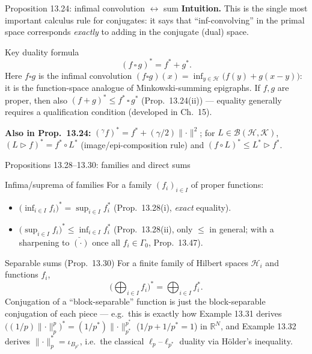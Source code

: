 \documentclass[aspectratio=169,10pt]{beamer}
\newcommand{\R}{\mathbb{R}}
\newcommand{\Hil}{\mathcal{H}}
\newcommand{\Kil}{\mathcal{K}}
\newcommand{\norm}[1]{\lVert #1 \rVert}
\newcommand{\conj}[1]{#1^{*}}
\begin{document}
\begin{frame}{Proposition 13.24: infimal convolution $\leftrightarrow$ sum}
  \textbf{Intuition.} This is the single most important calculus rule for
  conjugates: it says that ``inf-convolving'' in the primal space
  corresponds \emph{exactly} to adding in the conjugate (dual) space.
  \begin{block}{Key duality formula}
    \[
      (f\,\square\,g)^{*} = \conj f + \conj g.
      \tag{13.17}
    \]
    Here $f\square g$ is the infimal convolution
    $(f\square g)(x)=\inf_{y\in\Hil}\big(f(y)+g(x-y)\big)$: it is the
    function-space analogue of Minkowski-summing epigraphs. If $f,g$ are
    proper, then also $(f+g)^{*} \le \conj f\,\square\,\conj g$
    (Prop.\ 13.24(ii)) --- equality generally requires a qualification
    condition (developed in Ch.\ 15).
  \end{block}
  \textbf{Also in Prop.\ 13.24:} $({}^{\gamma}f)^{*} = \conj f +
  (\gamma/2)\norm{\cdot}^2$; for $L\in\mathcal B(\Hil,\Kil)$,
  $(L\triangleright f)^{*} = \conj f\circ L^{*}$ (image/epi-composition
  rule) and $(f\circ L)^{*}\le L^{*}\triangleright \conj f$.
\end{frame}

\begin{frame}{Propositions 13.28--13.30: families and direct sums}
  \begin{block}{Infima/suprema of families}
    For a family $(f_i)_{i\in I}$ of proper functions:
    \begin{itemize}
      \item $\big(\inf_{i\in I} f_i\big)^{*} = \sup_{i\in I}\conj{f_i}$
        (Prop.\ 13.28(i), \emph{exact} equality).
      \item $\big(\sup_{i\in I} f_i\big)^{*} \le \inf_{i\in I}\conj{f_i}$
        (Prop.\ 13.28(ii), only $\le$ in general; with a sharpening to
        $\breve{(\cdot)}$ once all $f_i\in\Gamma_0$, Prop.\ 13.47).
    \end{itemize}
  \end{block}
  \begin{block}{Separable sums (Prop.\ 13.30)}
    For a finite family of Hilbert spaces $\Hil_i$ and functions $f_i$,
    \[
      \Big(\bigoplus_{i\in I} f_i\Big)^{*} = \bigoplus_{i\in I}\conj{f_i}.
      \tag{13.25}
    \]
    Conjugation of a ``block-separable'' function is just the
    block-separable conjugation of each piece --- e.g.\ this is exactly how
    Example 13.31 derives $\big((1/p)\norm\cdot_p^p\big)^{*} =
    (1/p^{*})\norm\cdot_{p^{*}}^{p^{*}}$ ($1/p+1/p^{*}=1$) in $\R^N$, and
    Example 13.32 derives $\norm\cdot_p^{*} = \iota_{B_{p^{*}}}$, i.e.\
    the classical $\ell_p$--$\ell_{p^{*}}$ duality via H\"older's inequality.
  \end{block}
\end{frame}
\end{document}
